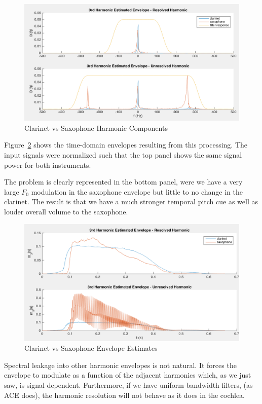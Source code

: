 \documentclass [11pt, proquest] {uwthesis}[2015/03/03]
\begin{document}
\begin{figure}[!ht]
\label{fig:clarinetVSsax_F}
  \centering
    \includegraphics[width=1\textwidth]{clarinetVSsax_F}
    \caption{Clarinet vs Saxophone Harmonic Components}
\end{figure}

Figure~\ref{fig:clarinetVSsax_T} shows the time-domain envelopes resulting from this processing.  The input signals were normalized such that the top panel shows the same signal power for both instruments.

The problem is clearly represented in the bottom panel, were we have a very large $F_0$ modulation in the saxophone envelope but little to no change in the clarinet.  The result is that we have a much stronger temporal pitch cue as well as louder overall volume to the saxophone.

\begin{figure}[!ht]
\label{fig:clarinetVSsax_T}
  \centering
    \includegraphics[width=1\textwidth]{clarinetVSsax_T}   
    \caption{Clarinet vs Saxophone Envelope Estimates}
\end{figure}

Spectral leakage into other harmonic envelopes is not natural.  It forces the envelope to modulate as a function of the adjacent harmonics which, as we just saw, is signal dependent.  Furthermore, if we have uniform bandwidth filters, (as ACE does), the harmonic resolution will not behave as it does in the cochlea.
\end{document}
